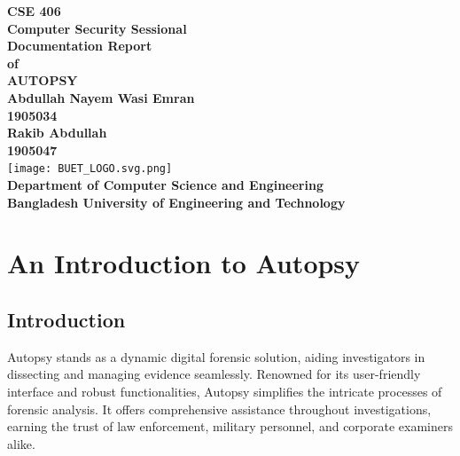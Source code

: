 \documentclass{article}
\begin{document}
\begin{titlepage}
    \centering
    \vspace*{2cm}
    {\Huge\textbf{CSE 406}}\\
    \vspace{0.5cm}
    {\Large\textbf{Computer Security Sessional}}\\
    \vspace{1.5cm}
    {\Huge\textbf{Documentation Report}}\\
    \vspace{0.2cm}
    {\Huge\textbf{of}}\\
    \vspace{0.2cm}
    {\Huge\textbf{AUTOPSY}}\\
    \vspace{1cm}
    {\Large\textbf{Abdullah Nayem Wasi Emran}}\\
    \vspace{0.2cm}
    {\large\textbf{1905034}}\\
    \vspace{0.3cm}
    {\Large\textbf{Rakib Abdullah}}\\
    \vspace{0.2cm}
    {\large\textbf{1905047}}\\
    \vspace{1cm}
    {\texttt{[image: BUET\_LOGO.svg.png]}}\\
    \vspace{1cm}
    {\Large\textbf{Department of Computer Science and Engineering}}\\
    \vspace{0.2cm}
    {\Large\textbf{Bangladesh University of Engineering and Technology}}\\
\end{titlepage}


\section{An Introduction to Autopsy}
\subsection{Introduction}
Autopsy stands as a dynamic digital forensic solution, aiding investigators in dissecting and managing evidence seamlessly. Renowned for its user-friendly interface and robust functionalities, Autopsy simplifies the intricate processes of forensic analysis. It offers comprehensive assistance throughout investigations, earning the trust of law enforcement, military personnel, and corporate examiners alike.
\end{document}
